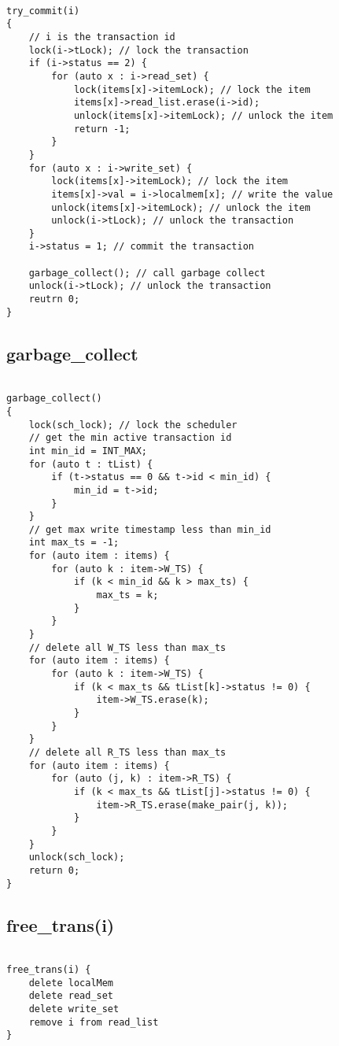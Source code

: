 \documentclass[12pt]{article}
\begin{document}
\begin{lstlisting}
    
try_commit(i)
{
    // i is the transaction id
    lock(i->tLock); // lock the transaction
    if (i->status == 2) {
        for (auto x : i->read_set) {
            lock(items[x]->itemLock); // lock the item
            items[x]->read_list.erase(i->id); 
            unlock(items[x]->itemLock); // unlock the item
            return -1;
        }
    }
    for (auto x : i->write_set) {
        lock(items[x]->itemLock); // lock the item
        items[x]->val = i->localmem[x]; // write the value
        unlock(items[x]->itemLock); // unlock the item
        unlock(i->tLock); // unlock the transaction
    }
    i->status = 1; // commit the transaction
    
    garbage_collect(); // call garbage collect
    unlock(i->tLock); // unlock the transaction
    reutrn 0;
}

\end{lstlisting}

\subsection{garbage\_collect}
\begin{lstlisting}

garbage_collect()
{
    lock(sch_lock); // lock the scheduler
    // get the min active transaction id
    int min_id = INT_MAX;
    for (auto t : tList) {
        if (t->status == 0 && t->id < min_id) {
            min_id = t->id;
        }
    }
    // get max write timestamp less than min_id
    int max_ts = -1;
    for (auto item : items) {
        for (auto k : item->W_TS) {
            if (k < min_id && k > max_ts) {
                max_ts = k;
            }
        }
    }
    // delete all W_TS less than max_ts
    for (auto item : items) {
        for (auto k : item->W_TS) {
            if (k < max_ts && tList[k]->status != 0) {
                item->W_TS.erase(k);
            }
        }
    }
    // delete all R_TS less than max_ts
    for (auto item : items) {
        for (auto (j, k) : item->R_TS) {
            if (k < max_ts && tList[j]->status != 0) {
                item->R_TS.erase(make_pair(j, k));
            }
        }
    }
    unlock(sch_lock); 
    return 0;
}

\end{lstlisting}

\subsection*{free\_trans(i)}

\begin{lstlisting}
    
free_trans(i) {
    delete localMem 
    delete read_set
    delete write_set
    remove i from read_list
}

\end{lstlisting}
\end{document}
